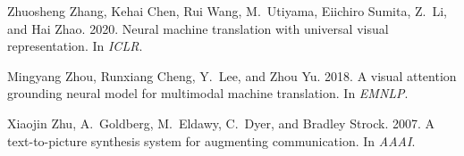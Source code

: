 \documentclass[11pt]{article}
\begin{document}
\begin{thebibliography}{36}
Zhuosheng Zhang, Kehai Chen, Rui Wang, M.~Utiyama, Eiichiro Sumita, Z.~Li, and
  Hai Zhao. 2020.
\newblock Neural machine translation with universal visual representation.
\newblock In \emph{ICLR}.

Mingyang Zhou, Runxiang Cheng, Y.~Lee, and Zhou Yu. 2018.
\newblock A visual attention grounding neural model for multimodal machine
  translation.
\newblock In \emph{EMNLP}.

Xiaojin Zhu, A.~Goldberg, M.~Eldawy, C.~Dyer, and Bradley Strock. 2007.
\newblock A text-to-picture synthesis system for augmenting communication.
\newblock In \emph{AAAI}.

\end{thebibliography}
 
\end{document}

